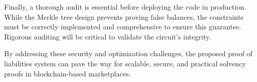 Finally, a thorough audit is essential before deploying the code in production. 
While the Merkle tree design prevents proving false balances, the constraints must be correctly implemented and comprehensive to ensure this guarantee. 
Rigorous auditing will be critical to validate the circuit's integrity.

By addressing these security and optimization challenges, the proposed proof of liabilities system can pave the way for scalable, 
secure, and practical solvency proofs in blockchain-based marketplaces.